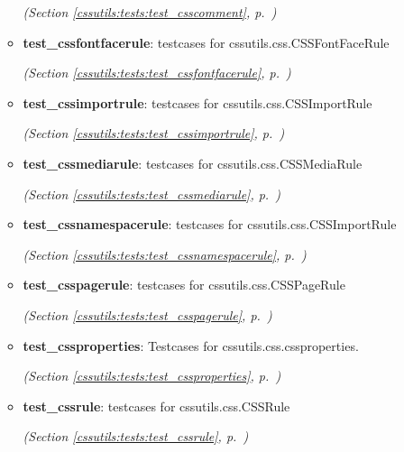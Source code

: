 \begin{itemize}
\begin{itemize}
  \textit{(Section \ref{cssutils:tests:test_csscomment}, p.~\pageref{cssutils:tests:test_csscomment})}

    \item \textbf{test\_cssfontfacerule}: testcases for cssutils.css.CSSFontFaceRule



  \textit{(Section \ref{cssutils:tests:test_cssfontfacerule}, p.~\pageref{cssutils:tests:test_cssfontfacerule})}

    \item \textbf{test\_cssimportrule}: testcases for cssutils.css.CSSImportRule



  \textit{(Section \ref{cssutils:tests:test_cssimportrule}, p.~\pageref{cssutils:tests:test_cssimportrule})}

    \item \textbf{test\_cssmediarule}: testcases for cssutils.css.CSSMediaRule



  \textit{(Section \ref{cssutils:tests:test_cssmediarule}, p.~\pageref{cssutils:tests:test_cssmediarule})}

    \item \textbf{test\_cssnamespacerule}: testcases for cssutils.css.CSSImportRule



  \textit{(Section \ref{cssutils:tests:test_cssnamespacerule}, p.~\pageref{cssutils:tests:test_cssnamespacerule})}

    \item \textbf{test\_csspagerule}: testcases for cssutils.css.CSSPageRule



  \textit{(Section \ref{cssutils:tests:test_csspagerule}, p.~\pageref{cssutils:tests:test_csspagerule})}

    \item \textbf{test\_cssproperties}: Testcases for cssutils.css.cssproperties.



  \textit{(Section \ref{cssutils:tests:test_cssproperties}, p.~\pageref{cssutils:tests:test_cssproperties})}

    \item \textbf{test\_cssrule}: testcases for cssutils.css.CSSRule



  \textit{(Section \ref{cssutils:tests:test_cssrule}, p.~\pageref{cssutils:tests:test_cssrule})}


\end{itemize}
\end{itemize}
